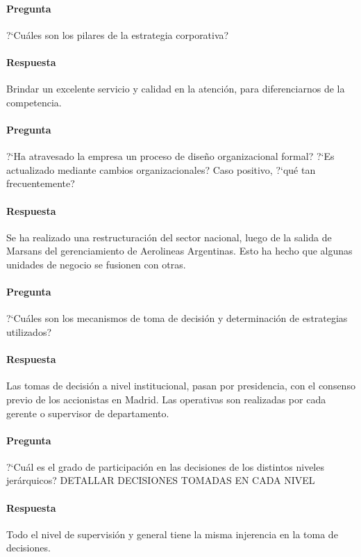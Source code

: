 \documentclass[12pt,a4paper,spanish]{article}
\begin{document}
	\paragraph{Pregunta}
	 ?`Cu\'ales son los pilares de la estrategia corporativa?
	\paragraph{Respuesta}
	Brindar un excelente servicio y calidad en la atenci\'on, para diferenciarnos de la competencia.

	\paragraph{Pregunta}
	 ?`Ha atravesado la empresa un proceso de dise\~{n}o organizacional formal?  ?`Es actualizado mediante cambios organizacionales? Caso positivo,  ?`qu\'e tan frecuentemente?
	\paragraph{Respuesta}
	Se ha realizado una restructuraci\'on del sector nacional, luego de la salida de Marsans del gerenciamiento de Aerolineas Argentinas. Esto ha hecho que algunas unidades de negocio se fusionen con otras.

	\paragraph{Pregunta}
	 ?`Cu\'ales son los mecanismos de toma de decisi\'on y determinaci\'on de estrategias utilizados?
	\paragraph{Respuesta}
	Las tomas de decisi\'on a nivel institucional, pasan por presidencia, con el consenso previo de los accionistas en Madrid. Las operativas son realizadas por cada gerente o supervisor de departamento.

	\paragraph{Pregunta}
	 ?`Cu\'al es el grado de participaci\'on en las decisiones de los distintos niveles jer\'arquicos? DETALLAR DECISIONES TOMADAS EN CADA NIVEL
	\paragraph{Respuesta}
	Todo el nivel de supervisi\'on y general tiene la misma injerencia en la toma de decisiones.
\end{document}
